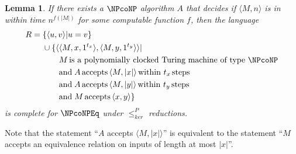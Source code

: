 \documentclass[draft]{article}
\newtheorem{lemma}[lemma]{Lemma}
\theoremstyle{definition} \newtheorem{openproblem}[openproblem]{Open problem}
\theoremstyle{definition} \newtheorem{definition}[definition]{Definition}
\theoremstyle{remark} \newtheorem{remark}[remark]{Remark}
\newcommand{\plain}[1]{\,\text{#1}\,} %
\newcommand{\kr}{\leq^{P}_{ker}} %
\newcommand{\pair}[2]{\langle#1,#2\rangle} %
\newcommand{\triple}[3]{\langle#1,#2,#3\rangle} %
\begin{document}
\begin{lemma}
  If there exists a $\NPcoNP$ algorithm $A$ that decides if $\pair{M}{n}$ is in  within time $n^{f(|M|)}$ for some computable function $f$, then the language
  \begin{align*}
    R = {} & \{\pair{u}{v}|u=v\} \\
    & \cup \{\pair{\triple{M}{x}{1^{t_x}}}{\triple{M}{y}{1^{t_y}}} | \\
    & \qquad M \plain{is a polynomially clocked Turing machine of type}\, \NPcoNP \\
    & \qquad \text{and}\; A \plain{accepts} \pair{M}{|x|} \plain{within}\, t_x \plain{steps}\\
    & \qquad \text{and}\; A \plain{accepts} \pair{M}{|y|} \plain{within}\, t_y \plain{steps}\\
    & \qquad \text{and}\; M \plain{accepts} \pair{x}{y}\}
  \end{align*}
  is complete for $\NPcoNPEq$ under $\kr$ reductions.
\end{lemma}
Note that the statement ``$A$ accepts $\pair{M}{|x|}$'' is equivalent to the statement ``$M$ accepts an equivalence relation on inputs of length at most $|x|$''.
\end{document}
